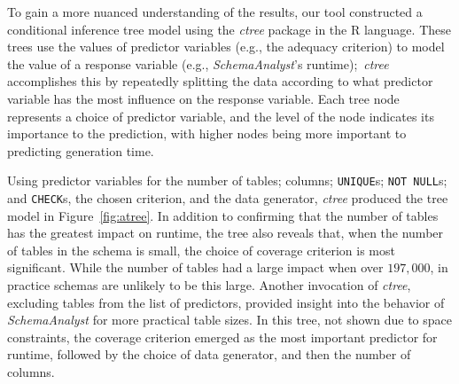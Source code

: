 
To gain a more nuanced understanding of the results, our tool constructed a conditional inference tree model using the
\textit{ctree} package in the R language. These trees use the values of predictor variables (e.g., the adequacy
criterion) to model the value of a response variable (e.g., {\em SchemaAnalyst}'s runtime);~\textit{ctree} accomplishes this
by repeatedly splitting the data according to what predictor variable has the most influence on the response variable.
Each tree node represents a choice of predictor variable, and the level of the node indicates its importance to
the prediction, with higher nodes being more important to predicting generation time.



Using predictor variables for the number of tables; columns; {\tt UNIQUE}s; {\tt NOT NULL}s; and {\tt CHECK}s, the chosen
criterion, and the data generator, \textit{ctree} produced the tree model in Figure~\ref{fig:atree}.  In addition to
confirming that the number of tables has the greatest impact on runtime, the tree also reveals that, when the number of
tables in the schema is small, the choice of coverage criterion is most
significant.  While the number of tables had a large impact when over $197,000$, in practice schemas are unlikely to be this large. Another invocation of
\textit{ctree}, excluding tables from the list of predictors, provided insight into the behavior of
\textit{SchemaAnalyst} for more practical table sizes. In this tree, not shown due to space constraints, the coverage
criterion emerged as the most important predictor for runtime, followed by the choice of data generator, and then the
number of columns.
